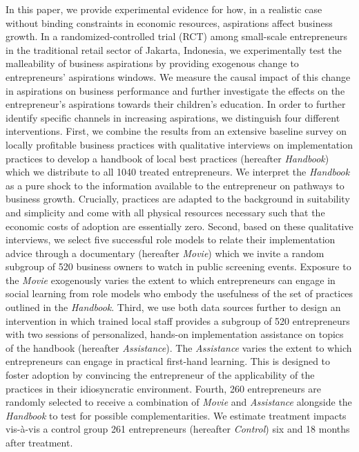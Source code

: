 \documentclass[11.5pt]{article}
\begin{document}
In this paper, we provide experimental evidence for how, in a realistic case without binding constraints in economic resources, aspirations affect business growth. In a randomized-controlled trial (RCT) among small-scale entrepreneurs in the traditional retail sector of Jakarta, Indonesia, we experimentally test the malleability of business aspirations by providing exogenous change to entrepreneurs' aspirations windows. We measure the causal impact of this change in aspirations on business performance and further investigate the effects on the entrepreneur's aspirations towards their children's education. In order to further identify specific channels in increasing aspirations, we distinguish four different interventions. First, we combine the results from an extensive baseline survey on locally profitable business practices with qualitative interviews on implementation practices to develop a handbook of local best practices (hereafter \emph{Handbook}) which we distribute to all 1040 treated entrepreneurs. We interpret the \emph{Handbook} as a pure shock to the information available to the entrepreneur on pathways to business growth. Crucially, practices are adapted to the background in suitability and simplicity and come with all physical resources necessary such that the economic costs of adoption are essentially zero. Second, based on these qualitative interviews, we select five successful role models to relate their implementation advice through a documentary (hereafter \emph{Movie}) which we invite a random subgroup of 520 business owners to watch in public screening events. Exposure to the \emph{Movie} exogenously varies the extent to which entrepreneurs can engage in social learning from role models who embody the usefulness of the set of practices outlined in the \emph{Handbook}. Third, we use both data sources further to design an intervention in which trained local staff provides a subgroup of 520 entrepreneurs with two sessions of personalized, hands-on implementation assistance on topics of the handbook (hereafter \emph{Assistance}). The \emph{Assistance} varies the extent to which entrepreneurs can engage in practical first-hand learning. This is designed to foster adoption by convincing the entrepreneur of the applicability of the practices in their idiosyncratic environment. Fourth, 260 entrepreneurs are randomly selected to receive a combination of \emph{Movie} and \emph{Assistance} alongside the \emph{Handbook} to test for possible complementarities. We estimate treatment impacts vis-\`{a}-vis a control group 261 entrepreneurs (hereafter \emph{Control}) six and 18 months after treatment.
\end{document}

